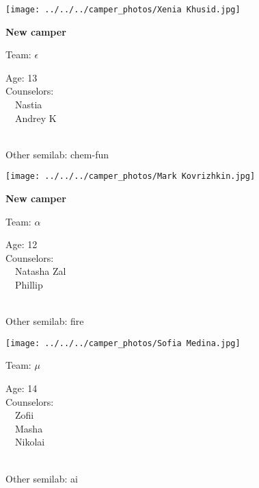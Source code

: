 \documentclass[10pt,letterpaper, landscape]{article}
\begin{document}
\verticalshiftfornextsticker
\renewcommand{\baselinestretch}{1} \begin{sticker}
\noindent\begin{minipage}{0.5\textwidth}\texttt{[image: ../../../camper\_photos/Xenia Khusid.jpg]}\end{minipage}\begin{minipage}{0.45\textwidth}
\textbf{New camper} 

Team: {\Large $\epsilon$}

Age:        13\\
Counselors: \\\ \ Nastia\\\ \ Andrey K\\
\end{minipage} \\ \vspace{0.07in}
Other semilab: chem-fun
\end{sticker}
\horizontalshiftfornextsticker
\renewcommand{\baselinestretch}{1} \begin{sticker}
\noindent\begin{minipage}{0.5\textwidth}\texttt{[image: ../../../camper\_photos/Mark Kovrizhkin.jpg]}\end{minipage}\begin{minipage}{0.45\textwidth}
\textbf{New camper} 

Team: {\Large $\alpha$}

Age:        12\\
Counselors: \\\ \ Natasha Zal\\\ \ Phillip\\
\end{minipage} \\ \vspace{0.07in}
Other semilab: fire
\end{sticker}
\horizontalshiftfornextsticker
\renewcommand{\baselinestretch}{1} \begin{sticker}
\noindent\begin{minipage}{0.5\textwidth}\texttt{[image: ../../../camper\_photos/Sofia Medina.jpg]}\end{minipage}\begin{minipage}{0.45\textwidth}
Team: {\Large $\mu$}

Age:        14\\
Counselors: \\\ \ Zofii\\\ \ Masha\\\ \ Nikolai\\
\end{minipage} \\ \vspace{0.07in}
Other semilab: ai
\end{sticker}
\end{document}
